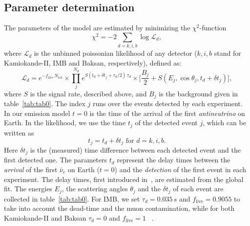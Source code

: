 \documentclass[a4paper,11pt]{article}
\begin{document}
\subsection{Parameter determination
}\label{s24}
The parameters of the model are estimated by minimizing the $\chi^2$-function
\begin{equation}
    \chi^2=-2\sum_{d=k,i,b}\log{\mathcal{L}_d},
    \label{eq:chi_squared_function}
\end{equation}
where $\mathcal{L}_d$ is the unbinned poissonian likelihood of any detector ($k,i,b$ stand for Kamiokande-II, IMB and Baksan, respectively), defined as:
\begin{equation}
\label{eq:likelihood_function}
    \mathcal{L}_d=e^{-f_{\text{live}}\,N_{\text{tot}}}\times \prod_{j}^{N_d}e^{S(t_d+\delta t_j+\tau_d/2)\, \tau_d}\times\bigg[\frac{B_j}{2}+S(E_j,\cos{\theta_j,t_d+\delta t_j})\bigg],
\end{equation}
where $S$ is the signal rate, described above, and $B_j$ is the background given in table~\ref{tab:tab0}.
The index $j$ runs over the  events detected by each experiment. In our emission model  $t=0$ is the time of the arrival of the first {\em antineutrino} on Earth.
In the likelihood, we use the time $t_j$ of the detected event $j$,
 which can be written as 
\begin{equation}
t_j=t_d+\delta t_j\mbox{ for }d=k,i,b.
\end{equation}
Here $\delta t_j$ is the (measured) time difference between each detected event  and the first detected one. 
 The  parameters $t_{d}$  represent the  delay times between the {\em arrival}
 of the first $\bar \nu_e$ on Earth 
 ($t=0$)
 and the {\em detection} of the first event in each experiment. 
The delay times, first introduced in~\cite{Abbott:1987bm}, are 
estimated from the global fit. 
%
The energies $E_j$, the scattering angles $\theta_j$ and the $\delta t_j$ of each event are collected in table~\ref{tab:tab0}. 
For IMB, we set $\tau_d=0.035\,\unit{s}$ and $f_{\text{live}}=0.9055$  to take into account the dead-time and the muon contamination, while for both Kamiokande-II and 
Baksan $\tau_d=0 $ and $f_{\text{live}}=1$ ~\cite{Loredo:2001rx}.
\end{document}
